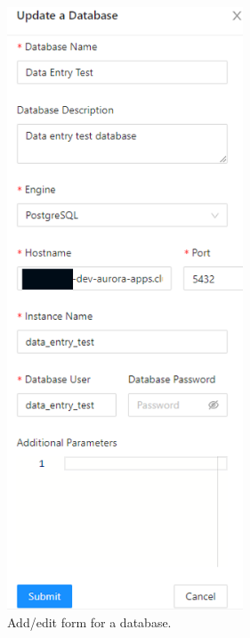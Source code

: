 \begin{figure}[!htb]
    \centering
    \includegraphics[width=7cm]{chapters/images/ch_3/FE/Admin/editDB.png}
    \caption{Add/edit form for a database.}
    \label{fig:editDB}
\end{figure}

